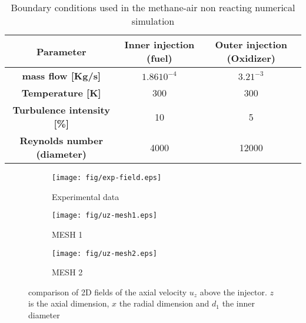 \documentclass[twocolumn,10pt]{asme2e}
\begin{document}
\begin{table}[t!]
\centering
\caption{Boundary conditions used in the methane-air non reacting numerical simulation }
\begin{adjustbox}{width=\columnwidth,center}
\begin{tabular}{|c|c|c|}
  \hline
  \textbf{Parameter} & \textbf{Inner injection (fuel)} & \textbf{Outer injection (Oxidizer)}\\
  \hline
  \textbf{mass flow [Kg/s]} & $1.86 10^{-4}$ & $3.21 ^{-3}$\\
    \hline
  \textbf{Temperature [K]} & 300 & 300 \\
    \hline
  \textbf{Turbulence intensity [\%]} & 10 & 5 \\
    \hline
  \textbf{Reynolds number (diameter)} & 4000 & 12000 \\
  \hline
\end{tabular}
\end{adjustbox}
  \label{tab:BC-Cold}
\end{table} 

\begin{figure*}
\hspace{-1.2 cm}
   \begin{subfigure}[b]{0.33\linewidth}        %
       \centering
       \texttt{[image: fig/exp-field.eps]}
       \caption{{Experimental data}}
   \end{subfigure}
   \hspace{-0.1 cm}
      \begin{subfigure}[b]{0.33\linewidth}        %
       \centering
       \texttt{[image: fig/uz-mesh1.eps]}
       {\caption{ {MESH 1 } }}
   \end{subfigure}
   \begin{subfigure}[b]{0.33\linewidth}        %
       \centering
       \texttt{[image: fig/uz-mesh2.eps]}
       \caption{ {MESH 2}  }
   \end{subfigure}
   \caption{comparison of 2D fields of the axial velocity $u_z$ above the injector. $z$ is the axial dimension, $x$ the radial dimension and $d_1$ the inner diameter }
   \label{fig:fields-uz}
\end{figure*}
\end{document}
